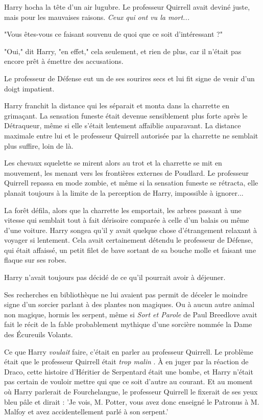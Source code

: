 Harry hocha la tête d'un air lugubre. Le professeur Quirrell avait deviné juste, mais pour les mauvaises raisons. \emph{Ceux qui ont vu la mort...} 

"Vous êtes-vous ce faisant souvenu de quoi que ce soit d'intéressant ?"

"Oui," dit Harry, "en effet," cela seulement, et rien de plus, car il n'était pas encore prêt à émettre des accusations.

Le professeur de Défense eut un de ses sourires secs et lui fit signe de venir d'un doigt impatient.

Harry franchit la distance qui les séparait et monta dans la charrette en grimaçant. La sensation funeste était devenue sensiblement plus forte après le Détraqueur, même si elle s'était lentement affaiblie auparavant. La distance maximale entre lui et le professeur Quirrell autorisée par la charrette ne semblait plus suffire, loin de là.

Les chevaux squelette se mirent alors au trot et la charrette se mit en mouvement, les menant vers les frontières externes de Poudlard. Le professeur Quirrell repassa en mode zombie, et même si la sensation funeste se rétracta, elle planait toujours à la limite de la perception de Harry, impossible à ignorer...

La forêt défila, alors que la charrette les emportait, les arbres passant à une vitesse qui semblait tout à fait dérisoire comparée à celle d'un balais ou même d'une voiture. Harry songea qu'il y avait quelque chose d'étrangement relaxant à voyager si lentement. Cela avait certainement détendu le professeur de Défense, qui était affaissé, un petit filet de bave sortant de sa bouche molle et faisant une flaque sur ses robes.

Harry n'avait toujours pas décidé de ce qu'il pourrait avoir à déjeuner.

Ses recherches en bibliothèque ne lui avaient pas permit de déceler le moindre signe d'un sorcier parlant à des plantes non magiques. Ou à aucun autre animal non magique, hormis les serpent, même si \emph{Sort et Parole}  de Paul Breedlove avait fait le récit de la fable probablement mythique d'une sorcière nommée la Dame des Écureuils Volants.

Ce que Harry \emph{voulait}  faire, c'était en parler au professeur Quirrell. Le problème était que le professeur Quirrell était \emph{trop malin} . À en juger par la réaction de Draco, cette histoire d'Héritier de Serpentard était une bombe, et Harry n'était pas certain de vouloir mettre qui que ce soit d'autre au courant. Et au moment où Harry parlerait de Fourchelangue, le professeur Quirrell le fixerait de ses yeux bleu pâle et dirait : 'Je vois, M. Potter, vous avez donc enseigné le Patronus à M. Malfoy et avez accidentellement parlé à son serpent.'

